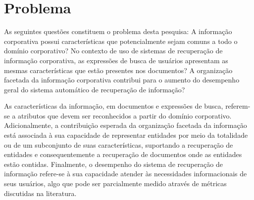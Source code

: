 

\section{Problema}

As seguintes questões constituem o problema desta pesquisa: 
A informação corporativa possui características que potencialmente sejam comuns a todo o domínio corporativo? 
No contexto de uso de sistemas de recuperação de informação corporativa, as expressões de busca de usuários apresentam as mesmas características que estão presentes nos documentos? 
A organização facetada da informação corporativa contribui para o aumento do desempenho geral do sistema automático de recuperação de informação?

As características da informação, em documentos e expressões de busca, referem-se a atributos que devem ser reconhecidos a partir do domínio corporativo. Adicionalmente, a contribuição esperada da organização facetada da informação está associada à sua capacidade de representar entidades por meio da totalidade ou de um subconjunto de suas características, suportando a recuperação de entidades e consequentemente a recuperação de documentos onde as entidades estão contidas. Finalmente, o desempenho do sistema de recuperação de informação refere-se à sua capacidade atender às necessidades informacionais de seus usuários, algo que pode ser parcialmente medido através de métricas discutidas na literatura.





